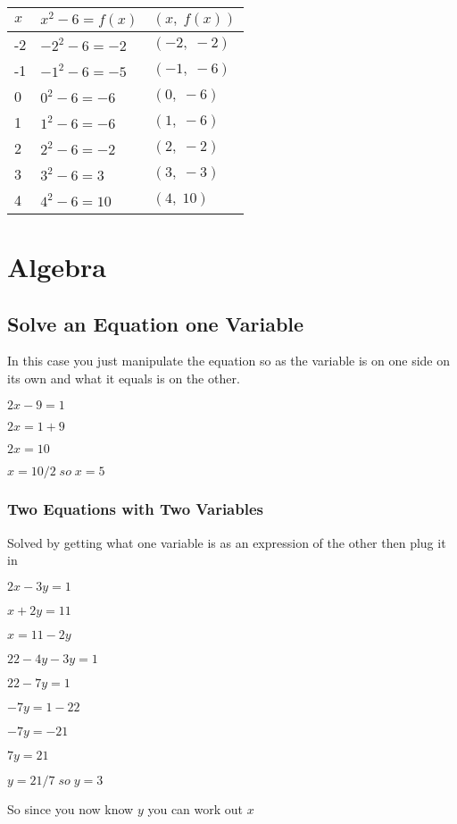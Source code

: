 \documentclass{article}
\begin{document}
\begin{tabular}{l|l|l}
$x$ & $ x^{2} - 6 = f(x)$& $(x,\;f(x))$  \\
\hline
-2 & $-2^{2} -6 = -2$ & $(-2,\;-2)$  \\
-1 & $-1^{2} -6 = -5$ & $(-1,\;-6)$  \\
0 & $0^{2} -6 = -6$ & $(0,\;-6)$  \\
1 & $1^{2} -6 = -6$ & $(1,\;-6)$  \\
2 & $2^{2} -6 = -2$ & $(2,\;-2)$  \\
3 & $3^{2} -6 = 3$ & $(3,\;-3)$  \\
4 & $4^{2} -6 = 10$ & $(4,\;10)$ \\

\end{tabular}



\newpage
\section{Algebra}
\subsection{Solve an Equation one Variable}
In this case you just manipulate the equation so as the variable is on one side on its own and what it equals is on the other.

$2x - 9 = 1$

$2x = 1 + 9 $

$2x = 10 $

$x = 10 /2  \;so \; x = 5$

\subsubsection{Two Equations with Two Variables}
Solved by getting what one variable is as an expression of the other then plug it in

$2x -3y = 1 $  
       
$x + 2y = 11 $	     

$x = 11 -2y$

$22-4y -3y = 1$

$22 - 7y = 1$

$-7y = 1-22$

$-7y = -21$

$7y = 21$

$y =21/7   \;so \;  y = 3$

So since you now know $y$ you can work out $x$
\end{document}
